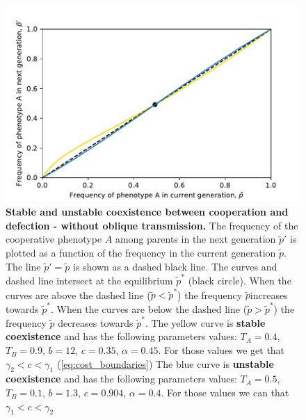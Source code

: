 \documentclass[12pt]{extarticle}
\begin{document}
{%
\begin{figure}[htb]
\centering
\includegraphics{coexistence_without_oblique.pdf}
\caption{\textbf{Stable and unstable coexistence between cooperation and defection - without oblique transmission.} The frequency of the cooperative phenotype $A$ among parents in the next generation $\tilde{p}'$ is plotted as a function of the frequency in the current generation $\tilde{p}$.
The line $\tilde{p}'=\tilde{p}$ is shown as a dashed black line. The curves and dashed line intersect at the equilibrium $\tilde{p}^*$ (black circle).
When the curves are above the dashed line ($\tilde{p}<\tilde{p}^*$) the frequency $\tilde{p}$increases towards $\tilde{p}^*$.
When the curves are below the dashed line ($\tilde{p}>\tilde{p}^*$) the frequency $\tilde{p}$ decreases towards $\tilde{p}^*$.
The yellow curve is \textbf{stable coexistence} and has the following parameters values:  $T_A = 0.4$, $T_B = 0.9$, $b = 12$, $c=0.35$, $\alpha = 0.45$. For those values we get that $\gamma_2<c<\gamma_1$ (\autoref{eq:cost_boundaries})
The blue curve is \textbf{unstable coexistence} and has the following parameters values: $T_A = 0.5$, $T_B = 0.1$, $b = 1.3$, $c=0.904$, $\alpha = 0.4$. For those values we can that $\gamma_1<c<\gamma_2$}
\label{fig:coexistence_without_oblique}
\end{figure}


}
\end{document}

